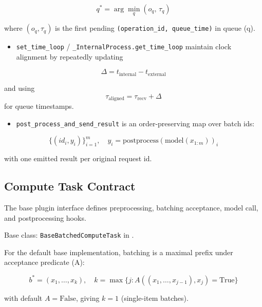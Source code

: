 \documentclass{article}
\providecommand{\tightlist}{\setlength{\itemsep}{0pt}\setlength{\parskip}{0pt}}
\begin{document}
\begin{equation}
q^*=\arg\min_q (o_q,\,\tau_q)
\end{equation}

where \((o_q,\tau_q)\) is the first pending
\texttt{(operation\_id,\ queue\_time)} in queue (q).

\begin{itemize}
\tightlist
\item
  \texttt{set\_time\_loop} / \texttt{\_InternalProcess.get\_time\_loop}
  maintain clock alignment by repeatedly updating
\end{itemize}

\begin{equation}
\Delta = t_{\mathrm{internal}} - t_{\mathrm{external}}
\end{equation}

and using
\[
\tau_{\mathrm{aligned}}=\tau_{\mathrm{recv}}+\Delta
\]
for queue timestamps.

\begin{itemize}
\tightlist
\item
  \texttt{post\_process\_and\_send\_result} is an order-preserving map
  over batch ids:
\end{itemize}

\begin{equation}
\{(id_i, y_i)\}_{i=1}^m,\quad y_i=\mathrm{postprocess}(\mathrm{model}(x_{1:m}))_i
\end{equation}

with one emitted result per original request id.

\hypertarget{62-compute-task-contract}{%
\subsection{Compute Task
Contract}\label{62-compute-task-contract}}

The base plugin interface defines preprocessing, batching acceptance,
model call, and postprocessing hooks.

Base class: \texttt{BaseBatchedComputeTask} in
.

For the default base implementation, batching is a maximal prefix under
acceptance predicate (A):

\begin{equation}
b^* = (x_1,\dots,x_k),\quad
k=\max\{j: A((x_1,\dots,x_{j-1}),x_j)=\text{True}\}
\end{equation}

with default \(A=\text{False}\), giving \(k=1\) (single-item
batches).
\end{document}
